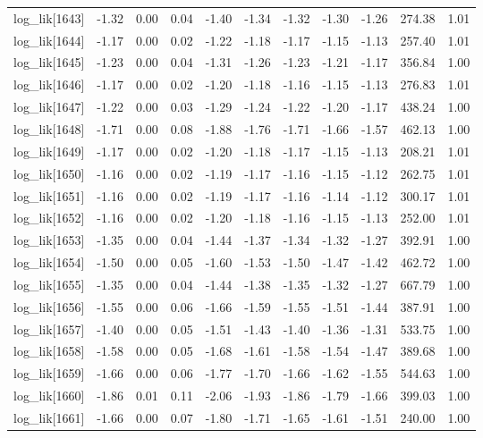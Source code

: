 \begin{table}[ht]
\begin{tabular}{rrrrrrrrrrr}
  log\_lik[1643] & -1.32 & 0.00 & 0.04 & -1.40 & -1.34 & -1.32 & -1.30 & -1.26 & 274.38 & 1.01 \\ 
  log\_lik[1644] & -1.17 & 0.00 & 0.02 & -1.22 & -1.18 & -1.17 & -1.15 & -1.13 & 257.40 & 1.01 \\ 
  log\_lik[1645] & -1.23 & 0.00 & 0.04 & -1.31 & -1.26 & -1.23 & -1.21 & -1.17 & 356.84 & 1.00 \\ 
  log\_lik[1646] & -1.17 & 0.00 & 0.02 & -1.20 & -1.18 & -1.16 & -1.15 & -1.13 & 276.83 & 1.01 \\ 
  log\_lik[1647] & -1.22 & 0.00 & 0.03 & -1.29 & -1.24 & -1.22 & -1.20 & -1.17 & 438.24 & 1.00 \\ 
  log\_lik[1648] & -1.71 & 0.00 & 0.08 & -1.88 & -1.76 & -1.71 & -1.66 & -1.57 & 462.13 & 1.00 \\ 
  log\_lik[1649] & -1.17 & 0.00 & 0.02 & -1.20 & -1.18 & -1.17 & -1.15 & -1.13 & 208.21 & 1.01 \\ 
  log\_lik[1650] & -1.16 & 0.00 & 0.02 & -1.19 & -1.17 & -1.16 & -1.15 & -1.12 & 262.75 & 1.01 \\ 
  log\_lik[1651] & -1.16 & 0.00 & 0.02 & -1.19 & -1.17 & -1.16 & -1.14 & -1.12 & 300.17 & 1.01 \\ 
  log\_lik[1652] & -1.16 & 0.00 & 0.02 & -1.20 & -1.18 & -1.16 & -1.15 & -1.13 & 252.00 & 1.01 \\ 
  log\_lik[1653] & -1.35 & 0.00 & 0.04 & -1.44 & -1.37 & -1.34 & -1.32 & -1.27 & 392.91 & 1.00 \\ 
  log\_lik[1654] & -1.50 & 0.00 & 0.05 & -1.60 & -1.53 & -1.50 & -1.47 & -1.42 & 462.72 & 1.00 \\ 
  log\_lik[1655] & -1.35 & 0.00 & 0.04 & -1.44 & -1.38 & -1.35 & -1.32 & -1.27 & 667.79 & 1.00 \\ 
  log\_lik[1656] & -1.55 & 0.00 & 0.06 & -1.66 & -1.59 & -1.55 & -1.51 & -1.44 & 387.91 & 1.00 \\ 
  log\_lik[1657] & -1.40 & 0.00 & 0.05 & -1.51 & -1.43 & -1.40 & -1.36 & -1.31 & 533.75 & 1.00 \\ 
  log\_lik[1658] & -1.58 & 0.00 & 0.05 & -1.68 & -1.61 & -1.58 & -1.54 & -1.47 & 389.68 & 1.00 \\ 
  log\_lik[1659] & -1.66 & 0.00 & 0.06 & -1.77 & -1.70 & -1.66 & -1.62 & -1.55 & 544.63 & 1.00 \\ 
  log\_lik[1660] & -1.86 & 0.01 & 0.11 & -2.06 & -1.93 & -1.86 & -1.79 & -1.66 & 399.03 & 1.00 \\ 
  log\_lik[1661] & -1.66 & 0.00 & 0.07 & -1.80 & -1.71 & -1.65 & -1.61 & -1.51 & 240.00 & 1.00 \\ 

\end{tabular}
\end{table}
